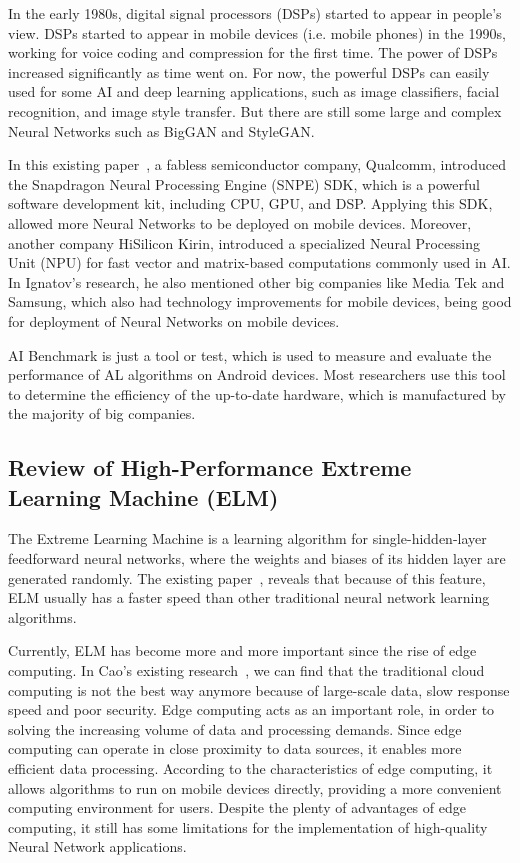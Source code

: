 \documentclass{article}
\begin{document}
In the early 1980s, digital signal processors (DSPs) started to appear in people’s view. DSPs started to appear in mobile devices (i.e. mobile phones) in the 1990s, working for voice coding and compression for the first time. The power of DSPs increased significantly as time went on. For now, the powerful DSPs can easily used for some AI and deep learning applications, such as image classifiers, facial recognition, and image style transfer. But there are still some large and complex Neural Networks such as BigGAN and StyleGAN.

In this existing paper~\cite{Andrey2019Aibenchmark},  a fabless semiconductor company, Qualcomm, introduced the Snapdragon Neural Processing Engine (SNPE) SDK, which is a powerful software development kit, including CPU, GPU, and DSP. Applying this SDK, allowed more Neural Networks to be deployed on mobile devices. Moreover, another company HiSilicon Kirin, introduced a specialized Neural Processing Unit (NPU) for fast vector and matrix-based computations commonly used in AI. In Ignatov’s research, he also mentioned other big companies like Media Tek and Samsung, which also had technology improvements for mobile devices, being good for deployment of Neural Networks on mobile devices.

AI Benchmark is just a tool or test, which is used to measure and evaluate the performance of AL algorithms on Android devices. Most researchers use this tool to determine the efficiency of the up-to-date hardware, which is manufactured by the majority of big companies. 

\subsection{Review of High-Performance Extreme Learning Machine (ELM)}
The Extreme Learning Machine is a learning algorithm for single-hidden-layer feedforward neural networks, where the weights and biases of its hidden layer are generated randomly. The existing paper~\cite{akusok2019metal}, reveals that because of this feature, ELM usually has a faster speed than other traditional neural network learning algorithms. 

Currently, ELM has become more and more important since the rise of edge computing. In Cao’s existing research~\cite{cao2020edgecomputing}, we can find that the traditional cloud computing is not the best way anymore because of large-scale data, slow response speed and poor security. Edge computing acts as an important role, in order to solving the increasing volume of data and processing demands. Since edge computing can operate in close proximity to data sources, it enables more efficient data processing. According to the characteristics of edge computing, it allows algorithms to run on mobile devices directly, providing a more convenient computing environment for users. Despite the plenty of advantages of edge computing, it still has some limitations for the implementation of high-quality Neural Network applications.
\end{document}
